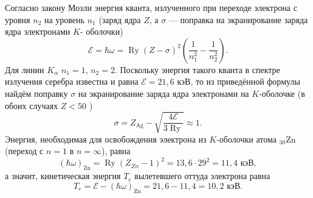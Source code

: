 \documentclass[a4paper]{article}
\begin{document}
\begin{sol}
	Согласно закону Мозли энергия кванта, излученного при переходе электрона с уровня $n_2$ на уровень $n_1$ (заряд ядра $Z$, а $\sigma$ --- поправка на экранирование заряда ядра электронами $K$- оболочки)
	\[
		\mathcal{E}=\hbar \omega  = \operatorname{Ry}
		(Z-\sigma)^2 \left( \frac{1}{n_1^2}-\frac{1}{n_2^2} \right) 
	.\] 
Для линии $K_\alpha$ $n_1=1$, $n_2=2$. Поскольку энергия такого
кванта в спектре излучения серебра известна и равна $\mathcal{E}=
21,6 \text{ кэВ}$, то из приведённой формулы найдём поправку $\sigma$ 
на экранирование заряда ядра электронами на $K$-оболочке (в обоих
случаях $Z<50$ )
\[
	\sigma=Z_{\text{Ag}}- \sqrt{\frac{4 \mathcal{E}}{3 \operatorname{Ry}}} \approx 1
.\] 
Энергия, необходимая для освобождения электрона из $K$-оболочки атома
$_{30}\text{Zn}$ (переход с $n=1$  в $n= \infty$), равна
 \[
	 (\hbar \omega)_\text{Zn}= \operatorname{Ry}
	 (Z_{Zn}-1)^2 = 13,6 \cdot 29^2=11,4 \text{ кэВ}
 ,\] 
а значит, кинетическая энергия $T_e$ вылетевшего оттуда электрона
равна
\[
	T_e= \mathcal{E}- (\hbar \omega)_{\operatorname{Zn}}=
	21,6-11,4=10,2 \text{ кэВ}
.\] 
\end{sol}
\end{document}
